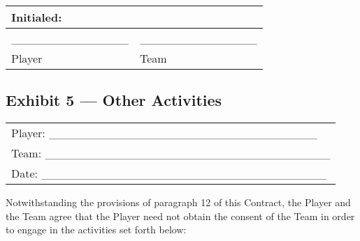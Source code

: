 \documentclass[
]{book}
\begin{document}
\begin{longtable}[]{@{}ll@{}}
\toprule()
Initialed: & \\
\midrule()
\endhead
\_\_\_\_\_\_\_\_\_\_\_\_\_\_ & \_\_\_\_\_\_\_\_\_\_\_\_\_\_ \\
Player & Team \\
\bottomrule()
\end{longtable}

\newpage

\hypertarget{exhibit-5-other-activities}{%
\subsection{Exhibit 5 --- Other Activities}\label{exhibit-5-other-activities}}

\begin{longtable}[]{@{}l@{}}
\toprule()
\endhead
Player: \_\_\_\_\_\_\_\_\_\_\_\_\_\_\_\_\_\_\_\_\_\_\_\_\_\_\_\_\_\_\_\_ \\
Team: \_\_\_\_\_\_\_\_\_\_\_\_\_\_\_\_\_\_\_\_\_\_\_\_\_\_\_\_\_\_\_\_\_\_ \\
Date: \_\_\_\_\_\_\_\_\_\_\_\_\_\_\_\_\_\_\_\_\_\_\_\_\_\_\_\_\_\_\_\_\_\_ \\
\bottomrule()
\end{longtable}

Notwithstanding the provisions of paragraph 12 of this Contract, the Player and the Team agree that the Player need not obtain the consent of the Team in order to engage in the activities set forth below:
\end{document}
